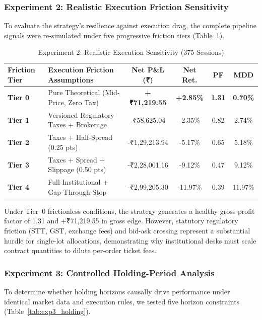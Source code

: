 \documentclass[journal]{IEEEtran}
\begin{document}
\subsubsection{Experiment 2: Realistic Execution Friction Sensitivity}
To evaluate the strategy's resilience against execution drag, the complete pipeline signals were re-simulated under five progressive friction tiers (Table~\ref{tab:exp2_sensitivity}).

\begin{table}[!t]
\renewcommand{\arraystretch}{1.15}
\caption{Experiment 2: Realistic Execution Sensitivity (375 Sessions)}
\label{tab:exp2_sensitivity}
\centering
\scriptsize
\begin{tabular}{llcccc}
\toprule
\textbf{Friction Tier} & \textbf{Execution Friction Assumptions} & \textbf{Net P\&L (₹)} & \textbf{Net Ret.} & \textbf{PF} & \textbf{MDD} \\
\midrule
\textbf{Tier 0} & Pure Theoretical (Mid-Price, Zero Tax) & \textbf{+₹71,219.55} & \textbf{+2.85\%} & \textbf{1.31} & \textbf{0.70\%} \\
\textbf{Tier 1} & Versioned Regulatory Taxes + Brokerage & -₹58,625.04 & -2.35\% & 0.82 & 2.74\% \\
\textbf{Tier 2} & Taxes + Half-Spread (0.25 pts) & -₹1,29,213.94 & -5.17\% & 0.65 & 5.18\% \\
\textbf{Tier 3} & Taxes + Spread + Slippage (0.50 pts) & -₹2,28,001.16 & -9.12\% & 0.47 & 9.12\% \\
\textbf{Tier 4} & Full Institutional + Gap-Through-Stop & -₹2,99,205.30 & -11.97\% & 0.39 & 11.97\% \\
\bottomrule
\end{tabular}
\end{table}

Under Tier~0 frictionless conditions, the strategy generates a healthy gross profit factor of 1.31 and +₹71,219.55 in gross edge. However, statutory regulatory friction (STT, GST, exchange fees) and bid-ask crossing represent a substantial hurdle for single-lot allocations, demonstrating why institutional desks must scale contract quantities to dilute per-order ticket fees.

\subsubsection{Experiment 3: Controlled Holding-Period Analysis}
To determine whether holding horizons causally drive performance under identical market data and execution rules, we tested five horizon constraints (Table~\ref{tab:exp3_holding}).
\end{document}
